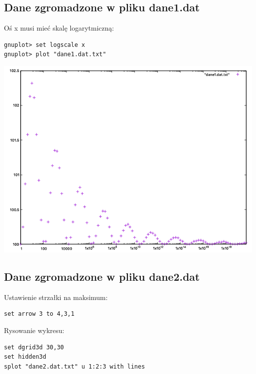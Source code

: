 \documentclass[5]{article}
\begin{document}
\subsection{Dane zgromadzone w pliku dane1.dat}

\hspace{4mm} Oś x musi mieć skalę logarytmiczną:
\begin{verbatim}
gnuplot> set logscale x
gnuplot> plot "dane1.dat.txt"
\end{verbatim}

\begin{center}
    \includegraphics[scale=0.7]{zad2.png} \par
    \vspace{3mm}
\end{center}

\newpage
\subsection{Dane zgromadzone w pliku dane2.dat}

\hspace{4mm} Ustawienie strzałki na maksimum: 
\begin{verbatim}
set arrow 3 to 4,3,1
\end{verbatim}

Rysowanie wykresu:
\begin{verbatim}
set dgrid3d 30,30
set hidden3d
splot "dane2.dat.txt" u 1:2:3 with lines
\end{verbatim}
\end{document}

